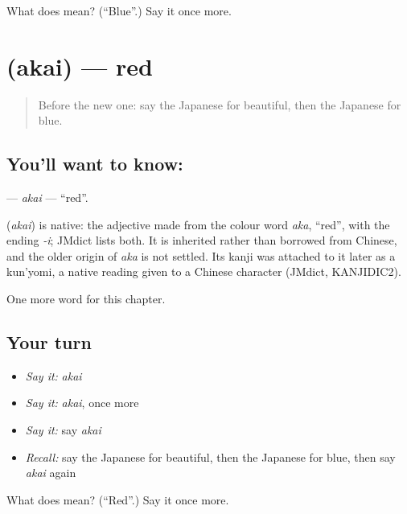 \begin{tcolorbox}[breakable,colback=teal!4,colframe=teal!35!black,title={Before you move on}]
What does  mean? (\textquotedblleft{}Blue\textquotedblright{}.) Say it once more.
\end{tcolorbox}
\section[\texorpdfstring{\ja{あかい} (akai)}{あかい (akai)}]{ (akai) — red}

\label{lesson:JA-C51-akai}



\begin{quote}
Before the new one: say the Japanese for beautiful, then the Japanese for blue.
\end{quote}

\subsection*{You'll want to know: }
\textbf{} — \emph{akai} — \textquotedblleft{}red\textquotedblright{}.

\begin{cousinweb}
\textbf{} (\emph{akai}) is native: the adjective made from the colour word \emph{aka}, \textquotedblleft{}red\textquotedblright{}, with the ending \emph{-i}; JMdict lists both. It is inherited rather than borrowed from Chinese, and the older origin of \emph{aka} is not settled. Its kanji was attached to it later as a kun'yomi, a native reading given to a Chinese character (JMdict, KANJIDIC2).
\end{cousinweb}

\begin{grammarlens}[title={What you've built}]
One more word for this chapter.
\end{grammarlens}

\subsection*{Your turn}
\begin{itemize}
\raggedright
  \item \emph{Say it:} \emph{akai}
  \item \emph{Say it:} \emph{akai}, once more
  \item \emph{Say it:} say \emph{akai}
  \item \emph{Recall:} say the Japanese for beautiful, then the Japanese for blue, then say \emph{akai} again
\end{itemize}

\begin{tcolorbox}[breakable,colback=teal!4,colframe=teal!35!black,title={Before you move on}]
What does  mean? (\textquotedblleft{}Red\textquotedblright{}.) Say it once more.
\end{tcolorbox}
